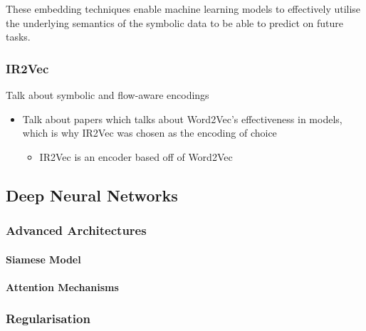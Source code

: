 These embedding techniques enable machine learning models to effectively utilise the underlying semantics of the symbolic data to be able to predict on future tasks.

\subsubsection{IR2Vec}
Talk about symbolic and flow-aware encodings


\begin{itemize}
 \item Talk about papers which talks about Word2Vec's effectiveness in models, which is why IR2Vec was chosen as the encoding of choice
 \begin{itemize}
 \item IR2Vec is an encoder based off of Word2Vec
 \end{itemize}
\end{itemize}


\subsection{Deep Neural Networks}

\subsubsection{Advanced Architectures}

\paragraph{Siamese Model}

\paragraph{Attention Mechanisms}

\subsubsection{Regularisation}



